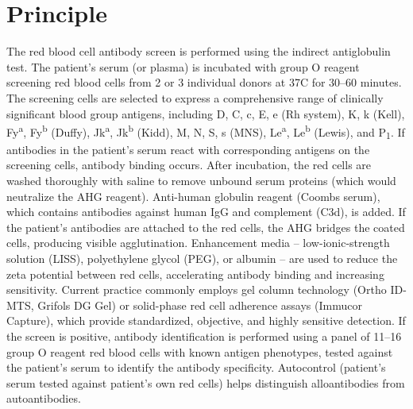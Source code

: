 \section*{Principle}
The red blood cell antibody screen is performed using the indirect antiglobulin test. The patient's serum (or plasma) is incubated with group O reagent screening red blood cells from 2 or 3 individual donors at 37\textdegree{}C for 30--60 minutes. The screening cells are selected to express a comprehensive range of clinically significant blood group antigens, including D, C, c, E, e (Rh system), K, k (Kell), Fy\textsuperscript{a}, Fy\textsuperscript{b} (Duffy), Jk\textsuperscript{a}, Jk\textsuperscript{b} (Kidd), M, N, S, s (MNS), Le\textsuperscript{a}, Le\textsuperscript{b} (Lewis), and P\textsubscript{1}. If antibodies in the patient's serum react with corresponding antigens on the screening cells, antibody binding occurs. After incubation, the red cells are washed thoroughly with saline to remove unbound serum proteins (which would neutralize the AHG reagent). Anti-human globulin reagent (Coombs serum), which contains antibodies against human IgG and complement (C3d), is added. If the patient's antibodies are attached to the red cells, the AHG bridges the coated cells, producing visible agglutination. Enhancement media -- low-ionic-strength solution (LISS), polyethylene glycol (PEG), or albumin -- are used to reduce the zeta potential between red cells, accelerating antibody binding and increasing sensitivity. Current practice commonly employs gel column technology (Ortho ID-MTS, Grifols DG Gel) or solid-phase red cell adherence assays (Immucor Capture), which provide standardized, objective, and highly sensitive detection. If the screen is positive, antibody identification is performed using a panel of 11--16 group O reagent red blood cells with known antigen phenotypes, tested against the patient's serum to identify the antibody specificity. Autocontrol (patient's serum tested against patient's own red cells) helps distinguish alloantibodies from autoantibodies.

